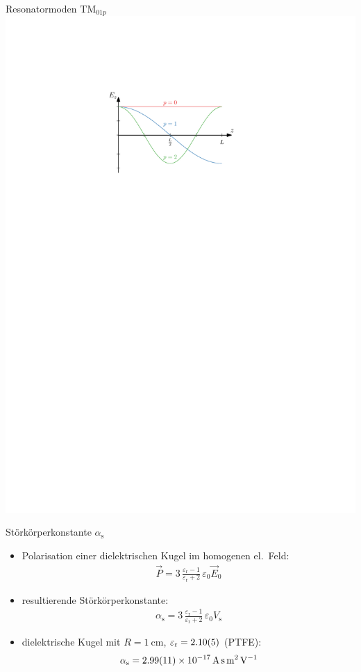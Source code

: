 \documentclass[12pt,xcolor=dvipsnames,professionalfonts]{beamer}
\begin{document}
\begin{frame}{Resonatormoden $\mathrm{TM}_{01p}$}
	\centering
	\includegraphics[scale=1.0]{./figures/longitudinale_periode.pdf}
\end{frame}

\begin{frame}{Störkörperkonstante $\alpha_\mathrm{s}$}
	\begin{itemize}
		\item Polarisation einer dielektrischen Kugel im homogenen el.\ Feld:
		\begin{align*}
			  \vec{P} = 3 \, \frac{\varepsilon_\mathrm{r} - 1}{\varepsilon_\mathrm{r} + 2} \, \varepsilon_0 \vec{E}_0
		\end{align*}
		
		\item resultierende Störkörperkonstante:
		\begin{align*}
			\alpha_\mathrm{s} = 3 \, \frac{\varepsilon_\mathrm{r} - 1}{\varepsilon_\mathrm{r} + 2} \, \varepsilon_0 V_\mathrm{s}
		\end{align*}
		
		\item dielektrische Kugel mit $R = \SI{1}{\centi\metre}$, $\varepsilon_\mathrm{r} = \num{2.1+- 0.05}$ (PTFE):
		\begin{align*}
			\alpha_\mathrm{s} = \SI{2.99 +- 0.11e-17}{\ampere\second\metre\squared\per\volt}
		\end{align*}
	\end{itemize}
\end{frame}
\end{document}
